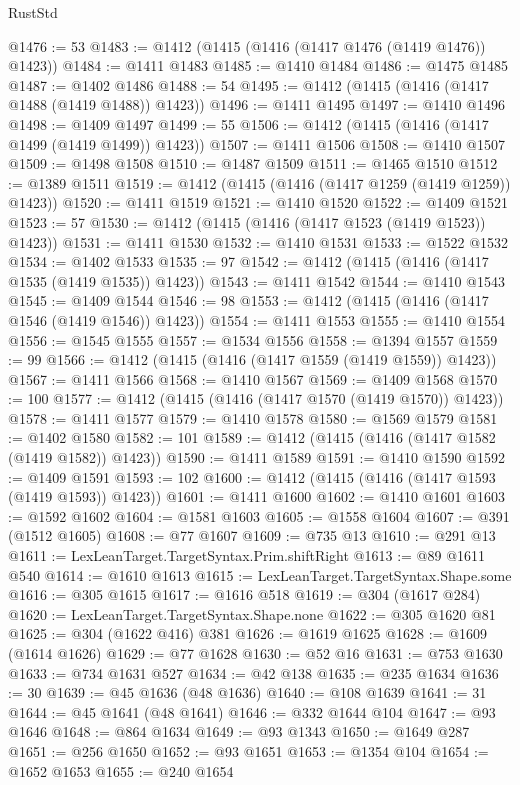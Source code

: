 \begin{lexlean}{RustStd}
\begin{coremodule}
@1476 := 53
@1483 := @1412 (@1415 (@1416 (@1417 @1476 (@1419 @1476)) @1423))
@1484 := @1411 @1483
@1485 := @1410 @1484
@1486 := @1475 @1485
@1487 := @1402 @1486
@1488 := 54
@1495 := @1412 (@1415 (@1416 (@1417 @1488 (@1419 @1488)) @1423))
@1496 := @1411 @1495
@1497 := @1410 @1496
@1498 := @1409 @1497
@1499 := 55
@1506 := @1412 (@1415 (@1416 (@1417 @1499 (@1419 @1499)) @1423))
@1507 := @1411 @1506
@1508 := @1410 @1507
@1509 := @1498 @1508
@1510 := @1487 @1509
@1511 := @1465 @1510
@1512 := @1389 @1511
@1519 := @1412 (@1415 (@1416 (@1417 @1259 (@1419 @1259)) @1423))
@1520 := @1411 @1519
@1521 := @1410 @1520
@1522 := @1409 @1521
@1523 := 57
@1530 := @1412 (@1415 (@1416 (@1417 @1523 (@1419 @1523)) @1423))
@1531 := @1411 @1530
@1532 := @1410 @1531
@1533 := @1522 @1532
@1534 := @1402 @1533
@1535 := 97
@1542 := @1412 (@1415 (@1416 (@1417 @1535 (@1419 @1535)) @1423))
@1543 := @1411 @1542
@1544 := @1410 @1543
@1545 := @1409 @1544
@1546 := 98
@1553 := @1412 (@1415 (@1416 (@1417 @1546 (@1419 @1546)) @1423))
@1554 := @1411 @1553
@1555 := @1410 @1554
@1556 := @1545 @1555
@1557 := @1534 @1556
@1558 := @1394 @1557
@1559 := 99
@1566 := @1412 (@1415 (@1416 (@1417 @1559 (@1419 @1559)) @1423))
@1567 := @1411 @1566
@1568 := @1410 @1567
@1569 := @1409 @1568
@1570 := 100
@1577 := @1412 (@1415 (@1416 (@1417 @1570 (@1419 @1570)) @1423))
@1578 := @1411 @1577
@1579 := @1410 @1578
@1580 := @1569 @1579
@1581 := @1402 @1580
@1582 := 101
@1589 := @1412 (@1415 (@1416 (@1417 @1582 (@1419 @1582)) @1423))
@1590 := @1411 @1589
@1591 := @1410 @1590
@1592 := @1409 @1591
@1593 := 102
@1600 := @1412 (@1415 (@1416 (@1417 @1593 (@1419 @1593)) @1423))
@1601 := @1411 @1600
@1602 := @1410 @1601
@1603 := @1592 @1602
@1604 := @1581 @1603
@1605 := @1558 @1604
@1607 := @391 (@1512 @1605)
@1608 := @77 @1607
@1609 := @735 @13
@1610 := @291 @13
@1611 := LexLeanTarget.TargetSyntax.Prim.shiftRight
@1613 := @89 @1611 @540
@1614 := @1610 @1613
@1615 := LexLeanTarget.TargetSyntax.Shape.some
@1616 := @305 @1615
@1617 := @1616 @518
@1619 := @304 (@1617 @284)
@1620 := LexLeanTarget.TargetSyntax.Shape.none
@1622 := @305 @1620 @81
@1625 := @304 (@1622 @416) @381
@1626 := @1619 @1625
@1628 := @1609 (@1614 @1626)
@1629 := @77 @1628
@1630 := @52 @16
@1631 := @753 @1630
@1633 := @734 @1631 @527
@1634 := @42 @138
@1635 := @235 @1634
@1636 := 30
@1639 := @45 @1636 (@48 @1636)
@1640 := @108 @1639
@1641 := 31
@1644 := @45 @1641 (@48 @1641)
@1646 := @332 @1644 @104
@1647 := @93 @1646
@1648 := @864 @1634
@1649 := @93 @1343
@1650 := @1649 @287
@1651 := @256 @1650
@1652 := @93 @1651
@1653 := @1354 @104
@1654 := @1652 @1653
@1655 := @240 @1654

\end{coremodule}
\end{lexlean}
